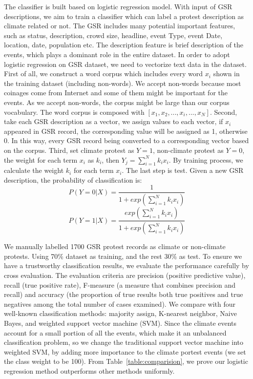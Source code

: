 \documentclass[9pt,twocolumn,twoside]{pnas-new}
\begin{document}
The classifier is built based on logistic regression model. With input of GSR descriptions, we aim to train a classifier which can label a protest description as climate related or not. The GSR includes many potential important features, such as status, description, crowd size, headline, event Type, event Date, location, date, population etc. The description feature is brief description of the events, which plays a dominant role in the entire dataset. In order to adopt logistic regression on GSR dataset, we need to vectorize text data in the dataset. First of all, we construct a word corpus which includes every word $x_i$ shown in the training dataset (including non-words). We accept non-words because most coinages come from Internet and some of them might be important for the events. As we accept non-words, the corpus might be large than our corpus vocabulary. The word corpus is composed with $[x_1, x_2, ..., x_i, ..., x_N]$.
Second, take each GSR description as a vector, we assign values to each vector, if $x_i$ appeared in GSR record, the corresponding value will be assigned as 1, otherwise 0. In this way, every GSR record being converted to a corresponding vector based on the corpus. Third, set climate protest as $Y=1$, non-climate protest as $Y=0$, the weight for each term $x_i$ as $k_i$, then $Y_j = \sum_{i=1}^{N} k_i x_i $. By training process, we calculate the weight $k_i$ for each term $x_i$. The last step is test. Given a new GSR description, the probability of classification is:
$$P(Y = 0| X)= \frac{1}{1+exp( {\sum_{i=1}^{N} k_ix_i})}$$
$$P(Y = 1| X)= \frac{exp( {\sum_{i=1}^{N} k_ix_i})}{1+exp( {\sum_{i=1}^{N} k_ix_i})}$$


We manually labelled 1700 GSR protest records as climate or non-climate protests. Using 70\% dataset as training, and the rest 30\% as test. To ensure we have a trustworthy classification results, we evaluate the performance carefully by cross evaluation. The evaluation criteria are precision (positive predictive value), recall (true positive rate), F-measure (a measure that combines precision and recall) and accuracy (the proportion of true results both true positives and true negatives among the total number of cases examined). We compare with four well-known classification methods: majority assign, K-nearest neighbor, Naive Bayes, and weighted support vector machine (SVM). Since the climate events account for a small portion of all the events, which make it an unbalanced classification problem, so we change the traditional support vector machine into weighted SVM, by adding more importance to the climate portest events (we set the class weight to be 100). From Table~\ref{table:comparision}, we prove our logistic regression method outperforms other methods uniformly.
\end{document}

